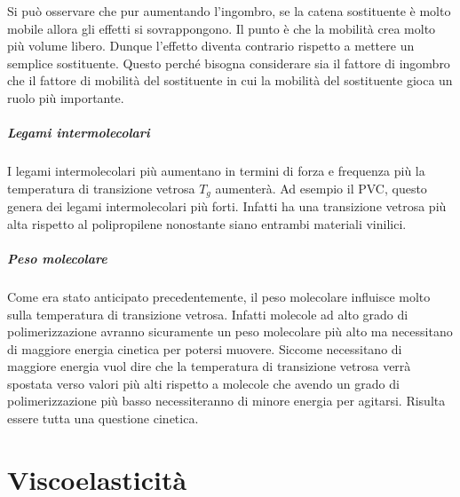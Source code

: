 Si può osservare che pur aumentando l'ingombro, se la catena sostituente è molto mobile allora gli effetti si sovrappongono. Il punto è che la mobilità crea molto più volume libero. Dunque l'effetto diventa contrario rispetto a mettere un semplice sostituente. Questo perché bisogna considerare sia il fattore di ingombro che il fattore di mobilità del sostituente in cui la mobilità del sostituente gioca un ruolo più importante.

\paragraph{Legami intermolecolari}
I legami intermolecolari più aumentano in termini di forza e frequenza più la temperatura di transizione vetrosa $T_g$ aumenterà.
Ad esempio il \ac{PVC}, questo genera dei legami intermolecolari più forti. Infatti ha una transizione vetrosa più alta rispetto al polipropilene nonostante siano entrambi materiali vinilici. 

\paragraph{Peso molecolare}
Come era stato anticipato precedentemente, il peso molecolare influisce molto sulla temperatura di transizione vetrosa. Infatti molecole ad alto grado di polimerizzazione avranno sicuramente un peso molecolare più alto ma necessitano di maggiore energia cinetica per potersi muovere.
Siccome necessitano di maggiore energia vuol dire che la temperatura di transizione vetrosa verrà spostata verso valori più alti rispetto a molecole che avendo un grado di polimerizzazione più basso necessiteranno di minore energia per agitarsi.
Risulta essere tutta una questione cinetica.

\chapter{Viscoelasticità}\label{ch:viscoelasticità}
